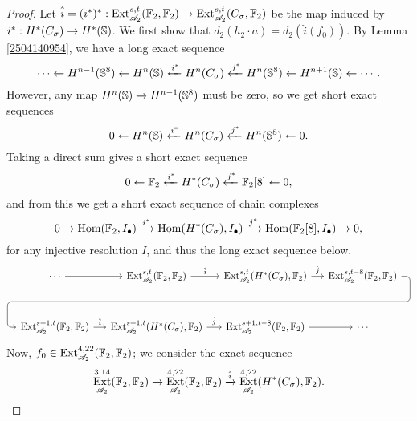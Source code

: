 \documentclass[11pt, titlepage]{article} %
\def\bb{\ensuremath\mathbb}
\def\A{\ensuremath{\mathscr{A}_2}}
\DeclareMathOperator{\Ext}{Ext}
\DeclareMathOperator{\Hom}{Hom}
\numberwithin{equation}{subsection}
\theoremstyle{plain}
\theoremstyle{definition}
\begin{document}
\begin{proof}
Let \(\hat i = (i^*)^* : \Ext_{\A}^{s,t}(\bb{F}_2, \bb{F}_2)\to \Ext_{\A}^{s,t}(C_\sigma, \bb{F}_2)\) be the map induced by \(i^* : H^*(C_\sigma)\to H^*(\bb{S})\). %
We first show that \(d_2(h_2\cdot a)=d_2(\hat i(f_0))\). By Lemma \ref{2504140954}, we have a long exact sequence
\[\cdots \leftarrow H^{n-1}(\bb{S}^8) \leftarrow H^n(\bb{S}) \xleftarrow{i^*} H^n(C_\sigma) \xleftarrow{j^*} H^n(\bb{S}^8)\leftarrow H^{n+1}(\bb{S}) \leftarrow \cdots.\]
However, any map \(H^n(\bb{S})\to H^{n-1}(\bb{S}^8)\) must be zero, so we get short exact sequences 
\[0 \leftarrow H^n(\bb{S})\xleftarrow{i^*} H^n(C_\sigma) \xleftarrow{j^*} H^n(\bb{S}^8)\leftarrow 0.\]
Taking a direct sum gives a short exact sequence
\[0 \leftarrow \bb{F}_2 \xleftarrow{i^*} H^*(C_\sigma) \xleftarrow{j^*} \bb{F}_2[8] \leftarrow 0,\]
and from this we get a short exact sequence of chain complexes
\[0 \to \Hom(\bb{F}_2, I_\bullet) \xrightarrow{i^*} \Hom(H^*(C_\sigma), I_\bullet) \xrightarrow{j^*} \Hom(\bb{F}_2[8], I_\bullet)\to 0,\]
for any injective resolution \(I\), and thus the long exact sequence below.
\[\begin{tikzcd}[row sep=7ex, column sep=3ex]
\cdots \arrow[r, ""] & \Ext_{\A}^{s,t}(\bb{F}_2, \bb{F}_2) \arrow[r, "\hat i"] & \Ext_{\A}^{s,t}(H^*(C_\sigma), \bb{F}_2) \arrow[r, "\hat j"] \arrow[draw=none]{d}[name=ar, anchor=center]{} & \Ext_{\A}^{s,t-8}(\bb{F}_2, \bb{F}_2) \arrow[rounded corners, to path={ -- ([xshift=2ex]\tikztostart.east) |- (ar.center) \tikztonodes -| ([xshift=-2ex]\tikztotarget.west) -- (\tikztotarget)}]{dlll}[at end]{} \\
\Ext_{\A}^{s+1,t}(\bb{F}_2, \bb{F}_2) \arrow[r, "\hat i"] & \Ext_{\A}^{s+1,t}(H^*(C_\sigma), \bb{F}_2) \arrow[r, "\hat j"] & \Ext_{\A}^{s+1,t-8}(\bb{F}_2, \bb{F}_2) \arrow[r, ""] & \cdots
\end{tikzcd}\]
Now, \(f_0\in \Ext_{\A}^{4,22}(\bb{F}_2, \bb{F}_2)\); we consider the exact sequence
\[\Ext_{\A}^{3,14}(\bb{F}_2, \bb{F}_2)\to \Ext_{\A}^{4,22}(\bb{F}_2, \bb{F}_2) \xrightarrow{\hat i} \Ext_{\A}^{4,22}(H^*(C_\sigma), \bb{F}_2).\]

\end{proof}
\end{document}
